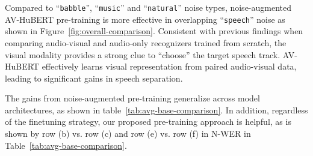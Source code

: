 Compared to ``\texttt{babble}'', ``\texttt{music}'' and ``\texttt{natural}'' noise types, noise-augmented AV-HuBERT pre-training is more effective in overlapping ``\texttt{speech}'' noise as shown in Figure~\ref{fig:overall-comparison}.  Consistent with previous findings when comparing audio-visual and audio-only recognizers trained from scratch, the visual modality provides a strong clue to ``choose'' the target speech track. AV-HuBERT effectively learns visual representation from paired audio-visual data, leading to significant gains in speech separation.

The gains from noise-augmented pre-training generalize across model architectures, as shown in table~\ref{tab:avg-base-comparison}. In addition, regardless of the finetuning strategy, our proposed pre-training approach is helpful, as is shown by row (b) vs. row (c) and row (e) vs. row (f) in N-WER in Table~\ref{tab:avg-base-comparison}.